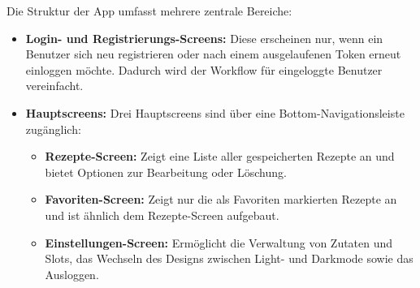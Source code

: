 Die Struktur der App umfasst mehrere zentrale Bereiche:

\begin{itemize}
    \item \textbf{Login- und Registrierungs-Screens:} Diese erscheinen nur, wenn ein Benutzer sich neu registrieren oder nach einem ausgelaufenen Token erneut einloggen möchte. Dadurch wird der Workflow für eingeloggte Benutzer vereinfacht.
    \item \textbf{Hauptscreens:} Drei Hauptscreens sind über eine Bottom-Navigationsleiste zugänglich:
    \begin{itemize}
        \item \textbf{Rezepte-Screen:} Zeigt eine Liste aller gespeicherten Rezepte an und bietet Optionen zur Bearbeitung oder Löschung.
        \item \textbf{Favoriten-Screen:} Zeigt nur die als Favoriten markierten Rezepte an und ist ähnlich dem Rezepte-Screen aufgebaut.
        \item \textbf{Einstellungen-Screen:} Ermöglicht die Verwaltung von Zutaten und Slots, das Wechseln des Designs zwischen Light- und Darkmode sowie das Ausloggen.
    \end{itemize}
\end{itemize}




